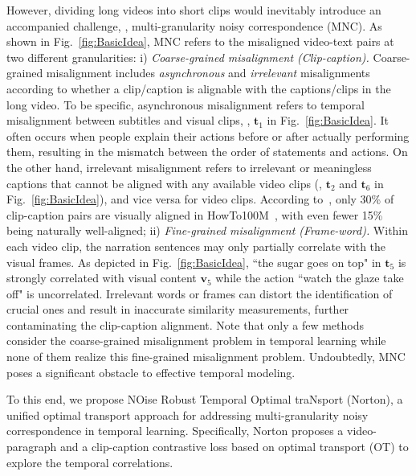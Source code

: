 However, dividing long videos into short clips would inevitably introduce an accompanied challenge, \ie, multi-granularity noisy correspondence (MNC).
As shown in Fig.~\ref{fig:BasicIdea}, MNC refers to the misaligned video-text pairs at two different granularities:
i) \textit{Coarse-grained misalignment (Clip-caption).} Coarse-grained misalignment includes \textit{asynchronous} and \textit{irrelevant} misalignments according to whether a clip/caption is alignable with the captions/clips in the long video. 
To be specific, asynchronous misalignment refers to temporal misalignment between subtitles and visual clips, \eg, $\mathbf{t}_1$ in Fig.~\ref{fig:BasicIdea}. It often occurs when people explain their actions before or after actually performing them, resulting in the mismatch between the order of statements and actions. 
On the other hand, irrelevant misalignment refers to irrelevant or meaningless captions that cannot be aligned with any available video clips (\eg, $\mathbf{t}_2$ and $\mathbf{t}_6$ in Fig.~\ref{fig:BasicIdea}), and vice versa for video clips. According to~\cite{tan}, only 30\% of clip-caption pairs are visually aligned in HowTo100M~\citep{howto100m}, with even fewer 15\% being naturally well-aligned; 
ii) \textit{Fine-grained misalignment (Frame-word).} Within each video clip, the narration sentences may only partially correlate with the visual frames. As depicted in Fig.~\ref{fig:BasicIdea}, ``the sugar goes on top" in $\mathbf{t}_5$ is strongly correlated with visual content $\mathbf{v}_5$ while the action ``watch the glaze take off" is uncorrelated. Irrelevant words or frames can distort the identification of crucial ones and result in inaccurate similarity measurements, further contaminating the clip-caption alignment. 
Note that only a few methods~\citep{tan} consider the coarse-grained misalignment problem in temporal learning while none of them realize this fine-grained misalignment problem. 
Undoubtedly, MNC poses a significant obstacle to effective temporal modeling.

To this end, we propose NOise Robust Temporal Optimal traNsport (Norton), a unified optimal transport approach for addressing multi-granularity noisy correspondence in temporal learning. Specifically, Norton proposes a video-paragraph and a clip-caption contrastive loss based on optimal transport (OT) to explore the temporal correlations. 

